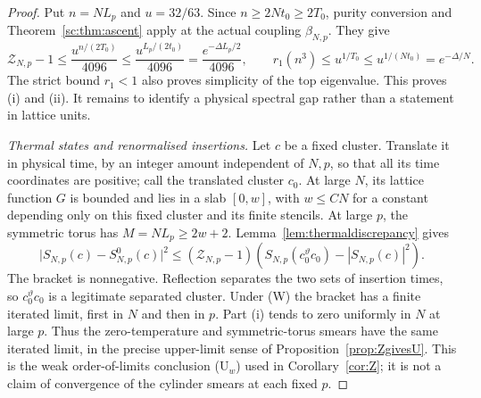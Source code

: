 \begin{proof}
Put $n=NL_p$ and $u=32/63$. Since $n\ge2Nt_0\ge2T_0$, purity conversion
and Theorem~\ref{sc:thm:ascent} apply at the actual coupling $\beta_{N,p}$.
They give
\[
\mathcal Z_{N,p}-1\le\frac{u^{n/(2T_0)}}{4096}
\le\frac{u^{L_p/(2t_0)}}{4096}
=\frac{e^{-\Delta L_p/2}}{4096},
\qquad
r_1(n^3)\le u^{1/T_0}\le u^{1/(Nt_0)}=e^{-\Delta/N}.
\]
The strict bound $r_1<1$ also proves simplicity of the top eigenvalue.
This proves (i) and (ii). It remains to identify a physical spectral gap
rather than a statement in lattice units.

\emph{Thermal states and renormalised insertions.}
Let $c$ be a fixed cluster. Translate it in physical time, by an integer
amount independent of $N,p$, so that all its time coordinates are positive;
call the translated cluster $c_0$. At large $N$, its lattice function $G$ is
bounded and lies in a slab $[0,w]$, with $w\le CN$ for a constant depending
only on this fixed cluster and its finite stencils. At large $p$, the
symmetric torus has $M=NL_p\ge2w+2$. Lemma~\ref{lem:thermaldiscrepancy}
gives
\begin{equation}\label{sc:eq:thermal-transfer}
\bigl|S_{N,p}(c)-S^0_{N,p}(c)\bigr|^2
\le(\mathcal Z_{N,p}-1)
\left(S_{N,p}(c_0^\vartheta c_0)-|S_{N,p}(c)|^2\right).
\end{equation}
The bracket is nonnegative. Reflection separates the two sets of insertion
times, so $c_0^\vartheta c_0$ is a legitimate separated cluster. Under
\textup{(W)} the bracket has a finite iterated limit, first in $N$ and then
in $p$. Part (i) tends to zero uniformly in $N$ at large $p$. Thus the
zero-temperature and symmetric-torus smears have the same iterated limit,
in the precise upper-limit sense of Proposition~\ref{prop:ZgivesU}.
This is the weak order-of-limits conclusion \textup{(U$_w$)} used in
Corollary~\ref{cor:Z}; it is not a claim of convergence of the cylinder
smears at each fixed $p$.


\end{proof}
